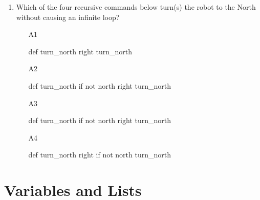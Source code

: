 \begin{enumerate}
\begin{enumerate}
\end{enumerate}
\item Which of the four recursive commands below 
turn(s) the robot to the North without causing an infinite loop?
\begin{enumerate}
\item[A1]
\begin{bluecode}
def turn_north
    right
    turn_north
\end{bluecode}
\item[A2] 
\begin{bluecode}
def turn_north
    if not north
        right
    turn_north
\end{bluecode}
\item[A3] 
\begin{bluecode}
def turn_north
    if not north
        right
        turn_north
\end{bluecode}
\item[A4] 
\begin{bluecode}
def turn_north
    right
    if not north 
        turn_north
\end{bluecode}
\end{enumerate}
\end{enumerate}


\section{Variables and Lists}

